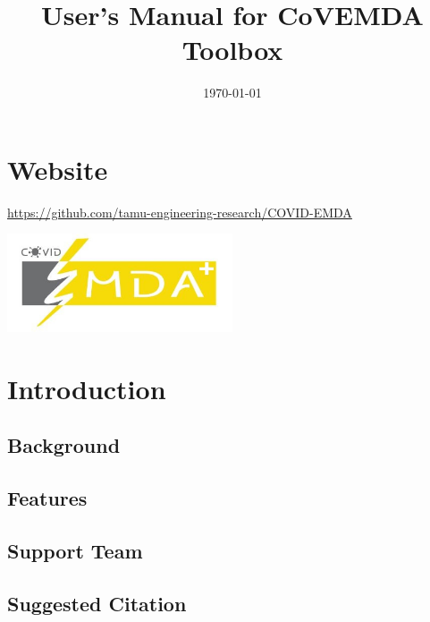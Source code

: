 \documentclass[11pt]{article}
\title{User's Manual for CoVEMDA Toolbox}
\author{}
\date{\today}
\numberwithin{equation}{section}
\numberwithin{table}{section}
\numberwithin{figure}{section}
\begin{document}
\maketitle
\thispagestyle{empty}
\newpage
\tableofcontents
\thispagestyle{empty}


\newpage
\setcounter{page}{1}
\section*{Website}

\url{https://github.com/tamu-engineering-research/COVID-EMDA}

\begin{center}
	\noindent\includegraphics[width=0.5\textwidth]{figures/covid_emda_logo.JPG}
\end{center}



\newpage
\section{Introduction} \label{sec:intro}

\subsection{Background}

\subsection{Features}

\subsection{Support Team}

\subsection{Suggested Citation}
\end{document}
